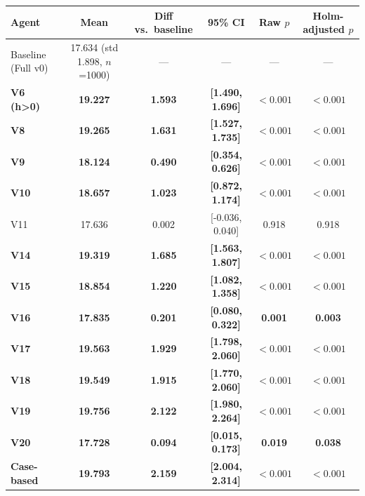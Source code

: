 \begin{tabular}{lccccc}
\toprule
Agent & Mean & Diff vs.\ baseline & 95\% CI & Raw $p$ & Holm-adjusted $p$ \\
\midrule
Baseline (Full v0) & 17.634 (std 1.898, $n$=1000) & --- & --- & --- & --- \\
\textbf{V6 (h>0)} & \textbf{19.227} & \textbf{1.593} & \textbf{[1.490, 1.696]} & \textbf{$<0.001$} & \textbf{$<0.001$} \\
\textbf{V8} & \textbf{19.265} & \textbf{1.631} & \textbf{[1.527, 1.735]} & \textbf{$<0.001$} & \textbf{$<0.001$} \\
\textbf{V9} & \textbf{18.124} & \textbf{0.490} & \textbf{[0.354, 0.626]} & \textbf{$<0.001$} & \textbf{$<0.001$} \\
\textbf{V10} & \textbf{18.657} & \textbf{1.023} & \textbf{[0.872, 1.174]} & \textbf{$<0.001$} & \textbf{$<0.001$} \\
V11 & 17.636 & 0.002 & [-0.036, 0.040] & 0.918 & 0.918 \\
\textbf{V14} & \textbf{19.319} & \textbf{1.685} & \textbf{[1.563, 1.807]} & \textbf{$<0.001$} & \textbf{$<0.001$} \\
\textbf{V15} & \textbf{18.854} & \textbf{1.220} & \textbf{[1.082, 1.358]} & \textbf{$<0.001$} & \textbf{$<0.001$} \\
\textbf{V16} & \textbf{17.835} & \textbf{0.201} & \textbf{[0.080, 0.322]} & \textbf{0.001} & \textbf{0.003} \\
\textbf{V17} & \textbf{19.563} & \textbf{1.929} & \textbf{[1.798, 2.060]} & \textbf{$<0.001$} & \textbf{$<0.001$} \\
\textbf{V18} & \textbf{19.549} & \textbf{1.915} & \textbf{[1.770, 2.060]} & \textbf{$<0.001$} & \textbf{$<0.001$} \\
\textbf{V19} & \textbf{19.756} & \textbf{2.122} & \textbf{[1.980, 2.264]} & \textbf{$<0.001$} & \textbf{$<0.001$} \\
\textbf{V20} & \textbf{17.728} & \textbf{0.094} & \textbf{[0.015, 0.173]} & \textbf{0.019} & \textbf{0.038} \\
\textbf{Case-based} & \textbf{19.793} & \textbf{2.159} & \textbf{[2.004, 2.314]} & \textbf{$<0.001$} & \textbf{$<0.001$} \\
\bottomrule
\end{tabular}
